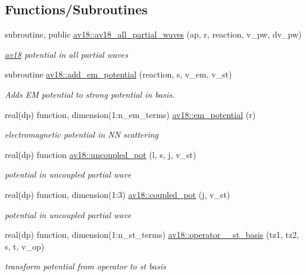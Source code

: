 \subsection*{Functions/\+Subroutines}
\begin{DoxyCompactItemize}
\item 
subroutine, public \hyperlink{namespaceav18_aa3a8f4d6382c199fcc71197445711d3d}{av18\+::av18\+\_\+all\+\_\+partial\+\_\+waves} (ap, r, reaction, v\+\_\+pw, dv\+\_\+pw)
\begin{DoxyCompactList}\small\item\em \hyperlink{namespaceav18}{av18} potential in all partial waves \end{DoxyCompactList}\item 
subroutine \hyperlink{namespaceav18_ac263bd481e6a61fd5eaae23d97dce143}{av18\+::add\+\_\+em\+\_\+potential} (reaction, s, v\+\_\+em, v\+\_\+st)
\begin{DoxyCompactList}\small\item\em Adds EM potential to strong potential in basis. \end{DoxyCompactList}\item 
real(dp) function, dimension(1\+:n\+\_\+em\+\_\+terms) \hyperlink{namespaceav18_af5419f35a68d9a2059fce4f02afd9af4}{av18\+::em\+\_\+potential} (r)
\begin{DoxyCompactList}\small\item\em electromagnetic potential in NN scattering \end{DoxyCompactList}\item 
real(dp) function \hyperlink{namespaceav18_a9d2b56f5ea01d81ae52e60b023551d9e}{av18\+::uncoupled\+\_\+pot} (l, s, j, v\+\_\+st)
\begin{DoxyCompactList}\small\item\em potential in uncoupled partial wave \end{DoxyCompactList}\item 
real(dp) function, dimension(1\+:3) \hyperlink{namespaceav18_a440cc1c708d1c17c19cad4ab67a6c289}{av18\+::coupled\+\_\+pot} (j, v\+\_\+st)
\begin{DoxyCompactList}\small\item\em potential in uncoupled partial wave \end{DoxyCompactList}\item 
real(dp) function, dimension(1\+:n\+\_\+st\+\_\+terms) \hyperlink{namespaceav18_aa01617c5c79d9290a3dce13819b9ef72}{av18\+::operator\+\_\+\_\+st\+\_\+basis} (tz1, tz2, s, t, v\+\_\+op)
\begin{DoxyCompactList}\small\item\em transform potential from operator to st basis \end{DoxyCompactList}\item 

\end{DoxyCompactItemize}
